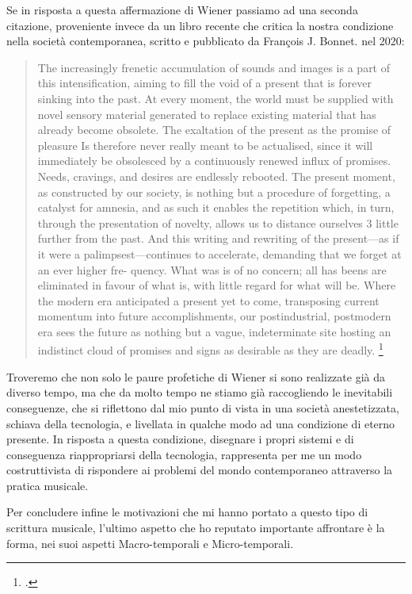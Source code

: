 Se in risposta a questa affermazione di Wiener passiamo ad una seconda citazione, proveniente invece da un libro 
recente che critica la nostra condizione nella società contemporanea, scritto e pubblicato da François J. Bonnet. nel 2020:

\begin{quote}
    The increasingly frenetic accumulation of sounds and
    images is a part of this intensification, aiming to fill the void of
    a present that is forever sinking into the past. At every
    moment, the world must be supplied with novel sensory
    material generated to replace existing material that has
    already become obsolete. The exaltation of the present as the
    promise of pleasure Is therefore never really meant to be actualised,
    since it will immediately be obsolesced by a continuously
    renewed influx of promises.
    Needs, cravings, and desires
    are endlessly rebooted.
    The present moment, as constructed by our society, is
    nothing but a procedure of forgetting, a catalyst for amnesia,
    and as such it enables the repetition which, in turn, through
    the presentation of novelty, allows us to distance ourselves
    3 little further from the past. And this writing and rewriting
    of the present—as if it were a palimpsest—continues to
    accelerate, demanding that we forget at an ever higher fre-
    quency. What was is of no concern; all has beens are eliminated
    in favour of what is, with little regard for what will be.
    Where the modern era anticipated a present yet to come,
    transposing current momentum into future accomplishments,
    our postindustrial, postmodern era sees the future as
    nothing but a vague, indeterminate site hosting an indistinct
    cloud of promises and signs as desirable as they are deadly. \footcite{francois_jbonnet_after_death}
\end{quote}

Troveremo che non solo le paure profetiche di Wiener si sono realizzate già da diverso tempo, 
ma che da molto tempo ne stiamo già raccogliendo le inevitabili conseguenze,
che si riflettono dal mio punto di vista in una società anestetizzata, 
schiava della tecnologia, e livellata in qualche modo ad una condizione di eterno presente.
In risposta a questa condizione, disegnare i propri sistemi e di conseguenza riappropriarsi della tecnologia,
rappresenta per me un modo costruttivista di rispondere ai problemi del mondo contemporaneo
attraverso la pratica musicale.

Per concludere infine le motivazioni che mi hanno portato a questo tipo di scrittura musicale, 
l'ultimo aspetto che ho reputato importante affrontare è la forma,
nei suoi aspetti Macro-temporali e Micro-temporali. 

